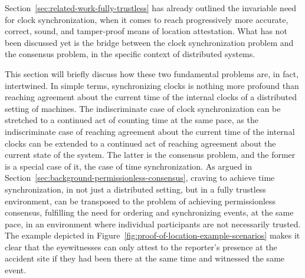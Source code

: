 Section~\ref{sec:related-work-fully-trustless} has already outlined the invariable need for clock synchronization, when it comes to reach progressively more accurate, correct, sound, and tamper-proof means of location attestation. What has not been discussed yet is the bridge between the clock synchronization problem and the consensus problem, in the specific context of distributed systems. 

This section will briefly discuss how these two fundamental problems are, in fact, intertwined. In simple terms, synchronizing clocks is nothing more profound than reaching agreement about the current time of the internal clocks of a distributed setting of machines. The indiscriminate case of clock synchronization can be stretched to a continued act of counting time at the same pace, as the indiscriminate case of reaching agreement about the current time of the internal clocks can be extended to a continued act of reaching agreement about the current state of the system. The latter is the consensus problem, and the former is a special case of it, the case of time synchronization. As argued in Section~\ref{sec:background-permissionless-consensus}, craving to achieve time synchronization, in not just a distributed setting, but in a fully trustless environment, can be transposed to the problem of achieving permissionless consensus, fulfilling the need for ordering and synchronizing events, at the same pace, in an environment where individual participants are not necessarily trusted. The example depicted in Figure~\ref{fig:proof-of-location-example-scenarios} makes it clear that the eyewitnesses can only attest to the reporter's presence at the accident site if they had been there at the same time and witnessed the same event.

